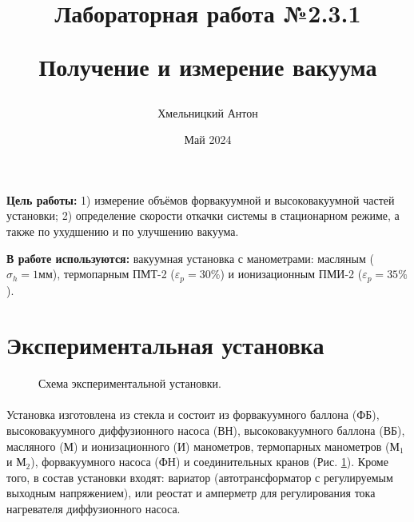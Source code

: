 \documentclass[a4paper, 12pt]{article}
\title{\begin{center}Лабораторная работа №2.3.1\end{center}
Получение и измерение вакуума}
\author{Хмельницкий Антон\\}
\date{Май 2024}
\begin{document}
    \maketitle
    

    \textbf{Цель работы:} 1) измерение объёмов форвакуумной и высоковакуумной частей установки; 2) определение скорости откачки системы в стационарном режиме, а также по ухудшению и по улучшению вакуума.

    \textbf{В работе используются:} вакуумная установка с манометрами: масляным ($\sigma_h = 1 мм$), термопарным ПМТ-2 ($\varepsilon_{p} = 30\%$) и ионизационным ПМИ-2 ($\varepsilon_{p} = 35\%$).

    \section{Экспериментальная установка}

    \begin{figure}[h]
        \caption{Схема экспериментальной установки.}
        \label{ris:ustanovka}
    \end{figure}

    \paragraph{}
    Установка изготовлена из стекла и состоит из форвакуумного баллона (ФБ), высоковакуумного диффузионного насоса (ВН), высоковакуумного баллона (ВБ), масляного (М) и ионизационного (И) манометров, термопарных манометров ($М_1$ и $М_2$), форвакуумного насоса (ФН) и соединительных кранов (Рис. \ref{ris:ustanovka}). Кроме того, в состав установки входят: вариатор (автотрансформатор с регулируемым выходным напряжением), или реостат и амперметр для регулирования тока нагревателя диффузионного насоса.
\end{document}
